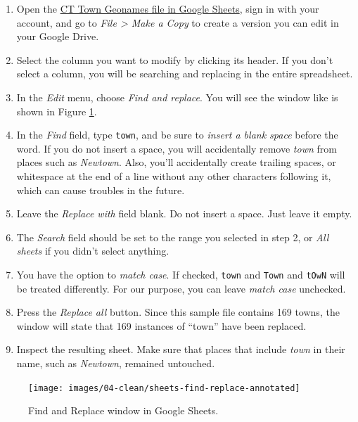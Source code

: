 \documentclass[
  english,
]{book}
\begin{document}
\begin{enumerate}
\def\labelenumi{\arabic{enumi}.}
\item
  Open the \href{https://docs.google.com/spreadsheets/d/1kJI0xFedPUQBRfT9CEMAfIsggOmJv4wz_AdenraFDP4/edit\#gid=1055822816}{CT Town Geonames file in Google Sheets}, sign in with your account, and go to \emph{File \textgreater{} Make a Copy} to create a version you can edit in your Google Drive.
\item
  Select the column you want to modify by clicking its header. If you don't select a column,
  you will be searching and replacing in the entire spreadsheet.
\item
  In the \emph{Edit} menu, choose \emph{Find and replace}. You will see the window like is shown in Figure \ref{fig:sheets-find-replace}.
\item
  In the \emph{Find} field, type \texttt{town}, and be sure to \emph{insert a blank space} before the word. If you do not insert a space, you will accidentally remove \emph{town} from places such as \emph{Newtown}. Also, you'll accidentally create trailing spaces, or whitespace at the end of a line without any other characters following it, which can cause troubles in the future.
\item
  Leave the \emph{Replace with} field blank. Do not insert a space. Just leave it empty.
\item
  The \emph{Search} field should be set to the range you selected in step 2, or \emph{All sheets} if you didn't select anything.
\item
  You have the option to \emph{match case}. If checked, \texttt{town} and \texttt{Town} and \texttt{tOwN} will be treated differently. For our purpose, you can leave \emph{match case} unchecked.
\item
  Press the \emph{Replace all} button. Since this sample file contains 169 towns, the window
  will state that 169 instances of ``town'' have been replaced.
\item
  Inspect the resulting sheet. Make sure that places that include \emph{town} in their name, such as \emph{Newtown}, remained untouched.
\end{enumerate}



\begin{figure}
\texttt{[image: images/04-clean/sheets-find-replace-annotated]} \caption{Find and Replace window in Google Sheets.}\label{fig:sheets-find-replace}
\end{figure}
\end{document}
